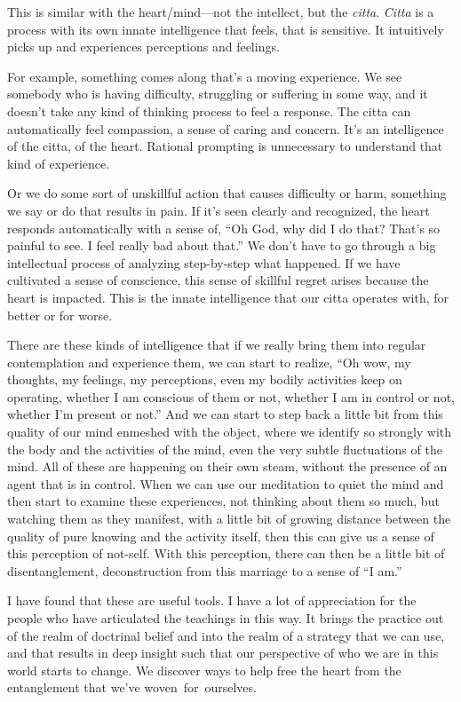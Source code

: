 This is similar with the heart/mind---not the intellect, but the \emph{citta}. \emph{Citta} is a process with its own innate intelligence that feels, that is sensitive. It intuitively picks up and experiences perceptions and feelings.

For example, something comes along that's a moving experience. We see somebody who is having difficulty, struggling or suffering in some way, and it doesn't take any kind of thinking process to feel a response. The citta can automatically feel compassion, a sense of caring and concern. It's an intelligence of the citta, of the heart. Rational prompting is unnecessary to understand that kind of experience.

Or we do some sort of unskillful action that causes difficulty or harm, something we say or do that results in pain. If it's seen clearly and recognized, the heart responds automatically with a sense of, ``Oh God, why did I do that? That's so painful to see. I feel really bad about that.'' We don't have to go through a big intellectual process of analyzing step-by-step what happened. If we have cultivated a sense of conscience, this sense of skillful regret arises because the heart is impacted. This is the innate intelligence that our citta operates with, for better or for worse.

There are these kinds of intelligence that if we really bring them into regular contemplation and experience them, we can start to realize, ``Oh wow, my thoughts, my feelings, my perceptions, even my bodily activities keep on operating, whether I am conscious of them or not, whether I am in control or not, whether I'm present or not.'' And we can start to step back a little bit from this quality of our mind enmeshed with the object, where we identify so strongly with the body and the activities of the mind, even the very subtle fluctuations of the mind. All of these are happening on their own steam, without the presence of an agent that is in control. When we can use our meditation to quiet the mind and then start to examine these experiences, not thinking about them so much, but watching them as they manifest, with a little bit of growing distance between the quality of pure knowing and the activity itself, then this can give us a sense of this perception of not-self. With this perception, there can then be a little bit of disentanglement, deconstruction from this marriage to a sense of ``I am.''

I have found that these are useful tools. I have a lot of appreciation for the people who have articulated the teachings in this way. It brings the practice out of the realm of doctrinal belief and into the realm of a strategy that we can use, and that results in deep insight such that our perspective of who we are in this world starts to change. We discover ways to help free the heart from the entanglement that we've \mbox{woven for ourselves.}

